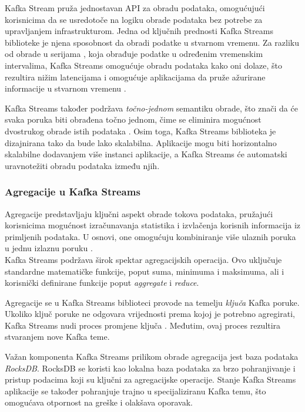 \documentclass[times, utf8, diplomski]{fer}
\begin{document}
Kafka Stream pruža jednostavan API za obradu podataka, omogućujući korisnicima da se usredotoče na logiku obrade podataka bez potrebe za upravljanjem infrastrukturom. Jedna od ključnih prednosti Kafka Streams biblioteke je njena sposobnost da obradi podatke u stvarnom vremenu. 
Za razliku od obrade u serijama , koja obrađuje podatke u određenim vremenskim intervalima, Kafka Streams omogućuje obradu podataka kako oni dolaze, što rezultira nižim latencijama i omogućuje aplikacijama da pruže ažurirane informacije u stvarnom vremenu \citep{seymour_mastering_2021}.

Kafka Streams također podržava \emph{\glqq točno-jednom\grqq} semantiku obrade, što znači da će svaka poruka biti obrađena točno jednom, čime se eliminira mogućnost dvostrukog obrade istih podataka \citep{narkhede_exactly-once_2017}.
Osim toga, Kafka Streams biblioteka je dizajnirana tako da bude lako skalabilna. Aplikacije mogu biti horizontalno skalabilne dodavanjem više instanci aplikacije, a Kafka Streams će automatski uravnotežiti obradu podataka između njih.

\subsubsection{Agregacije u Kafka Streams}

Agregacije predstavljaju ključni aspekt obrade tokova podataka, pružajući korisnicima mogućnost izračunavanja statistika i izvlačenja korisnih informacija iz primljenih podataka. U osnovi, one omogućuju kombiniranje više ulaznih poruka u jednu izlaznu poruku \citep{seymour_mastering_2021}.\\

Kafka Streams podržava širok spektar agregacijskih operacija. Ovo uključuje standardne matematičke funkcije, poput suma, minimuma i maksimuma, ali i korisnički definirane funkcije poput \emph{aggregate} i \emph{reduce}.

Agregacije se u Kafka Streams biblioteci provode na temelju \emph{ključa} Kafka poruke. Ukoliko ključ poruke ne odgovara vrijednosti prema kojoj je potrebno agregirati, Kafka Streams nudi proces promjene ključa . Međutim, ovaj proces rezultira stvaranjem nove Kafka teme.

Važan komponenta Kafka Streams prilikom obrade agregacija jest baza podataka \emph{RocksDB}. RocksDB se koristi kao lokalna baza podataka za brzo pohranjivanje i pristup podacima koji su ključni za agregacijske operacije. Stanje Kafka Streams aplikacije se također pohranjuje trajno u specijaliziranu Kafka temu, što omogućava otpornost na greške i olakšava oporavak.\\
\end{document}
